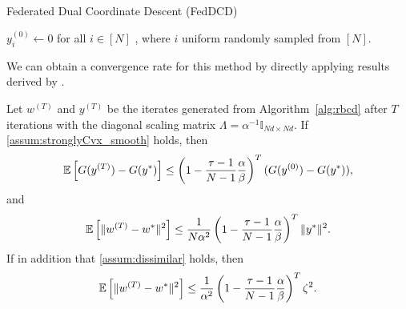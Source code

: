 \begin{algorithm}[t]
    \DontPrintSemicolon
    \caption{Federated Dual Coordinate Descent (FedDCD)\label{alg:rbcd}}
    \smallskip
    $y_i^{(0)} \gets 0$ for all $i \in [N]$
    , where $i$ uniform randomly sampled from $[N]$. 
\end{algorithm}

We can obtain a convergence rate for this method by directly applying results derived by \citet{necoara2017random}.

\begin{theorem} \label{thm:necoaraConvergenceRate}
    Let $w^{(T)}$ and $y^{(T)}$ be the iterates generated from Algorithm~\ref{alg:rbcd} after $T$ iterations with the diagonal scaling matrix $\Lambda = \alpha^{-1} \mathbb{I}_{Nd \times Nd}$. If \autoref{assum:stronglyCvx_smooth} holds, then
    \begin{equation}
        \mathbb{E} \left[ G( y^{(T)} ) - G( y^* ) \right] \leq \left( 1 - \frac{\tau - 1}{N-1} \frac{\alpha}{\beta} \right)^{T} ( G(y^{(0)}) - G(y^*) ), \label{eq:necoaraDualConvergenceStrongCVX}
    \end{equation}
    and
    \begin{equation}
        \mathbb{E} \left[ \| w^{(T)} - w^* \|^2 \right] 
        \leq \frac{1}{N \alpha^2} \left( 1 - \frac{\tau - 1}{N-1} \frac{\alpha}{\beta} \right)^{T} \|y^*\|^2  \label{eq:necoaraPrimalConvergenceStrongCVX}.
    \end{equation}
    If in addition that \autoref{assum:dissimilar} holds, then
    \begin{equation}
        \mathbb{E} \left[ \| w^{(T)} - w^* \|^2 \right] 
        \leq \frac{1}{\alpha^2} \left( 1 - \frac{\tau - 1}{N-1} \frac{\alpha}{\beta} \right)^{T} \zeta^2. \label{eq:necoaraPrimalConvergenceDissimilar}
    \end{equation}
\end{theorem}

